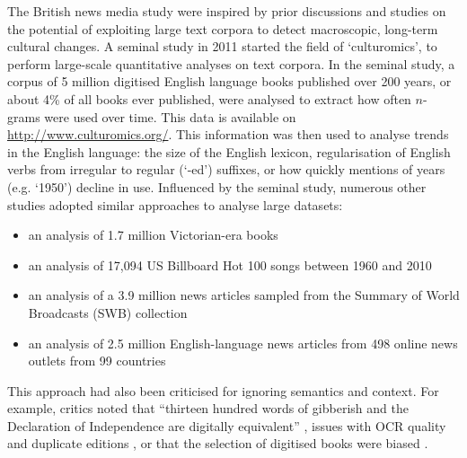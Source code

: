 \documentclass{report}
\begin{document}
The British news media study were inspired by prior discussions and studies on the potential of exploiting large text corpora to detect macroscopic, long-term cultural changes. 
A seminal study in 2011 \cite{michel2011quantitative} started the field of `culturomics', to perform large-scale quantitative analyses on text corpora.
In the seminal study, a corpus of 5 million digitised English language books published over 200 years, or about 4\% of all books ever published, were analysed to extract how often $n$-grams were used over time.
This data is available on \url{http://www.culturomics.org/}.
This information was then used to analyse trends in the English language: the size of the English lexicon, regularisation of English verbs from irregular to regular (`-ed') suffixes, or how quickly mentions of years (e.g. `1950') decline in use.
Influenced by the seminal study, numerous other studies adopted similar approaches to analyse large datasets: 
\begin{itemize}
	\item an analysis of 1.7 million Victorian-era books \cite{gibbs2011conversation}
	\item an analysis of 17,094 US Billboard Hot 100 songs between 1960 and 2010 \cite{mauch2015evolution}
	\item an analysis of a 3.9 million news articles sampled from the Summary of World Broadcasts (SWB) collection \cite{leetaru2011culturomics}
	\item an analysis of 2.5 million English-language news articles from 498 online news outlets from 99 countries \cite{flaounas2013research}
\end{itemize}
This approach had also been criticised for ignoring semantics and context.
For example, critics noted that ``thirteen hundred words of gibberish and the Declaration of Independence are digitally equivalent'' \cite{gooding2013mass}, issues with OCR quality and duplicate editions \cite{gooding2013mass}, or that the selection of digitised books were biased \cite{schwartz2011culturomics}.
\end{document}
